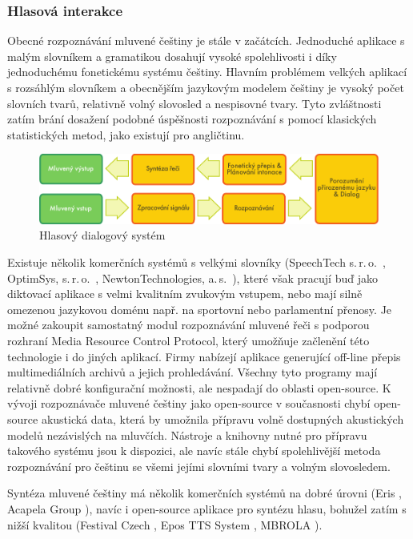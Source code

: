 \begin{multicols}{2}
\subsubsection{Hlasová interakce}

Obecné rozpoznávání mluvené češtiny je stále v začátcích. Jednoduché aplikace s malým slovníkem a gramatikou dosahují vysoké spolehlivosti i díky jednoduchému fonetickému systému češtiny. Hlavním problémem velkých aplikací s rozsáhlým slovníkem a obecnějším jazykovým modelem češtiny je vysoký počet slovních tvarů, relativně volný slovosled a nespisovné tvary. Tyto zvláštnosti zatím brání dosažení podobné úspěšnosti rozpoznávání s pomocí klasických statistických metod, jako existují pro angličtinu.
\begin{figure}[htb]
  \center
  \includegraphics[width=\textwidth]{../_media/czech/simple_speech-based_dialogue_architecture}
  \caption{Hlasový dialogový systém}
  \label{fig:dialoguearch_cz}
\end{figure}
Existuje několik komerčních systémů s velkými slovníky (SpeechTech s.\,r.\,o.~\cite{Note11}, OptimSys, s.\,r.\,o.~\cite{Note12}, NewtonTechnologies, a.\,s.~\cite{Note13}), které však pracují buď jako diktovací aplikace s velmi kvalitním zvukovým vstupem, nebo mají silně omezenou jazykovou doménu např. na sportovní nebo parlamentní přenosy. Je možné zakoupit samostatný modul rozpoznávání mluvené řeči s podporou rozhraní Media Resource Control Protocol, který umožňuje začlenění této technologie i do jiných aplikací. Firmy nabízejí aplikace generující off-line přepis multimediálních archivů a jejich prohledávání. Všechny tyto programy mají relativně dobré konfigurační možnosti, ale nespadají do oblasti open-source. K vývoji rozpoznávače mluvené češtiny jako open-source v současnosti chybí open-source akustická data, která by umožnila přípravu volně dostupných akustických modelů nezávislých na mluvčích. Nástroje a knihovny nutné pro přípravu takového systému jsou k dispozici, ale navíc stále chybí spolehlivější metoda rozpoznávání pro češtinu se všemi jejími slovními tvary a volným slovosledem.

Syntéza mluvené češtiny má několik komerčních systémů na dobré úrovni (Eris \cite{Note11}, Acapela Group \cite{Note14}), navíc i open-source aplikace pro syntézu hlasu, bohužel zatím s nižší kvalitou (Festival Czech \cite{Note15}, Epos TTS System \cite{Note16}, MBROLA \cite{Note17}).


\end{multicols}
